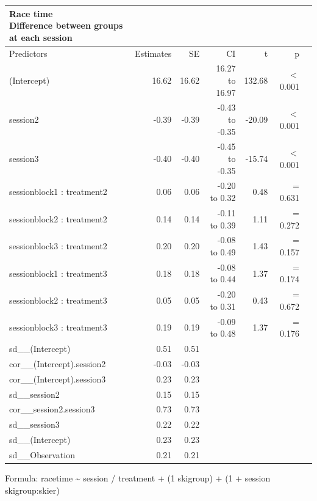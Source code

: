 \documentclass[pdflatex,sn-mathphys-num]{sn-jnl}%
\theoremstyle{thmstyleone}%
\theoremstyle{thmstyletwo}%
\theoremstyle{thmstylethree}%
\begin{document}
\begin{appendices}
\setlength{\LTpost}{0mm}
\begin{longtable}{lrrrrrl}\label{suptable_racetime_groupdiffeachsession}
\caption*{
{\large Race time} \\ 
{\small Difference between groups at each session}
} \\ 
\toprule
Predictors & Estimates & SE & CI & t & p \\ 
\midrule\addlinespace[2.5pt]
(Intercept) & 16.62 & 16.62 & 16.27 to 16.97 & 132.68 &  $<$ 0.001 \\ 
session2 & -0.39 & -0.39 & -0.43 to -0.35 & -20.09 &  $<$  0.001 \\ 
session3 & -0.40 & -0.40 & -0.45 to -0.35 & -15.74 &  $<$  0.001 \\ 
sessionblock1 : treatment2 & 0.06 & 0.06 & -0.20 to 0.32 & 0.48 &  =  0.631 \\ 
sessionblock2 : treatment2 & 0.14 & 0.14 & -0.11 to 0.39 & 1.11 &  =  0.272 \\ 
sessionblock3 : treatment2 & 0.20 & 0.20 & -0.08 to 0.49 & 1.43 &  =  0.157 \\ 
sessionblock1 : treatment3 & 0.18 & 0.18 & -0.08 to 0.44 & 1.37 &  =  0.174 \\ 
sessionblock2 : treatment3 & 0.05 & 0.05 & -0.20 to 0.31 & 0.43 &  =  0.672 \\ 
sessionblock3 : treatment3 & 0.19 & 0.19 & -0.09 to 0.48 & 1.37 &  =  0.176 \\ 
sd\_\_(Intercept) & 0.51 & 0.51 & & & & \\ 
cor\_\_(Intercept).session2 & -0.03 & -0.03 & & & & \\ 
cor\_\_(Intercept).session3 & 0.23 & 0.23 & & & &  \\ 
sd\_\_session2 & 0.15 & 0.15 & & & &  \\ 
cor\_\_session2.session3 & 0.73 & 0.73 & & & & \\ 
sd\_\_session3 & 0.22 & 0.22 & & & & \\ 
sd\_\_(Intercept) & 0.23 & 0.23 & & & & \\ 
sd\_\_Observation & 0.21 & 0.21 & & & & \\ 
\bottomrule
\end{longtable}
\begin{minipage}{\linewidth}
Formula: racetime \textasciitilde{} session / treatment + (1  \textbar{} skigroup) + (1 + session \textbar{} skigroup:skier)\\
\end{minipage}




\end{appendices}
\end{document}

